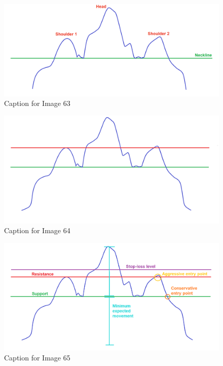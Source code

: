 \documentclass{article}
\begin{document}
\vspace{10pt}

\begin{figure}[!htb]
    \centering
    \includegraphics[width=\textwidth]{imgs/63.png}
    \caption{Caption for Image 63}
\end{figure}

\vspace{10pt}

\begin{figure}[!htb]
    \centering
    \includegraphics[width=\textwidth]{imgs/64.png}
    \caption{Caption for Image 64}
\end{figure}

\vspace{10pt}

\begin{figure}[!htb]
    \centering
    \includegraphics[width=\textwidth]{imgs/65.png}
    \caption{Caption for Image 65}
\end{figure}
\end{document}
